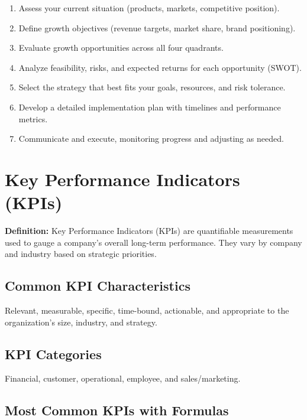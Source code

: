 \documentclass[11pt, letterpaper]{article}
\begin{document}
\begin{enumerate}[leftmargin=*, label=\textbf{\arabic*.}]
  \item Assess your current situation (products, markets, competitive position).
  \item Define growth objectives (revenue targets, market share, brand positioning).
  \item Evaluate growth opportunities across all four quadrants.
  \item Analyze feasibility, risks, and expected returns for each opportunity (SWOT).
  \item Select the strategy that best fits your goals, resources, and risk tolerance.
  \item Develop a detailed implementation plan with timelines and performance metrics.
  \item Communicate and execute, monitoring progress and adjusting as needed.
\end{enumerate}

\newpage

\section{Key Performance Indicators (KPIs)}

\begin{defbox}
\textbf{Definition:} Key Performance Indicators (KPIs) are quantifiable measurements used to gauge a company's overall long-term performance. They vary by company and industry based on strategic priorities.
\end{defbox}

\subsection{Common KPI Characteristics}

Relevant, measurable, specific, time-bound, actionable, and appropriate to the organization's size, industry, and strategy.

\subsection{KPI Categories}

Financial, customer, operational, employee, and sales/marketing.

\subsection{Most Common KPIs with Formulas}
\end{document}
